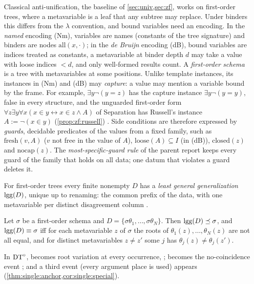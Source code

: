 Classical anti-unification, the baseline of \cref{sec:univ,sec:zf}, works on first-order trees, where a metavariable is a leaf that any subtree may replace. Under binders this differs from the $\lambda$ convention, and bound variables need an encoding. In the \emph{named} encoding (Nm), variables are names (constants of the tree signature) and binders are nodes $\mathrm{all}(x,\cdot)$; in the \emph{de Bruijn} encoding (dB), bound variables are indices treated as constants, a metavariable at binder depth $d$ may take a value with loose indices $<d$, and only well-formed results count. A \emph{first-order schema} is a tree with metavariables at some positions. Unlike template instances, its instances in (Nm) and (dB) may \emph{capture}: a value may mention a variable bound by the frame. For example, $\exists y\neg(y=z)$ has the capture instance $\exists y\neg(y=y)$, false in every structure, and the unguarded first-order form $\forall z\exists y\forall x(x\in y\leftrightarrow x\in z\wedge A)$ of Separation has Russell's instance $A:=\neg(x\in y)$ (\cref{prop:zf:russell}) . Side conditions are therefore expressed by \emph{guards}, decidable predicates of the values from a fixed family, such as $\mathrm{fresh}(v,A)$ ($v$ not free in the value of $A$), $\mathrm{loose}(A)\subseteq I$ (in (dB)), $\mathrm{closed}(z)$ and $\mathrm{nocap}(z)$. The \emph{most-specific-guard rule} of the parent report keeps every guard of the family that holds on all data; one datum that violates a guard deletes it.

For first-order trees every finite nonempty $D$ has a \emph{least general generalization} $\mathrm{lgg}(D)$, unique up to renaming: the common prefix of the data, with one metavariable per distinct disagreement column \citep{plotkin1970note,reynolds1970transformational}.

\begin{lemma}\label{lem:setting:recover}
Let $\sigma$ be a first-order schema and $D=\{\sigma\theta_1,\dots,\sigma\theta_N\}$. Then $\mathrm{lgg}(D)\preceq\sigma$, and $\mathrm{lgg}(D)\equiv\sigma$ iff \evR{} for each metavariable $z$ of $\sigma$ the roots of $\theta_1(z),\dots,\theta_N(z)$ are not all equal, and \evD{} for distinct metavariables $z\neq z'$ some $j$ has $\theta_j(z)\neq\theta_j(z')$.
\end{lemma}

In $\mathrm{DT}^{\circ}$, \evR{} becomes root variation at every occurrence, \evRs{}; \evD{} becomes the no-coincidence event \evU{}; and a third event \evN{} (every argument place is used) appears (\cref{thm:single:anchor,cor:single:special}).

